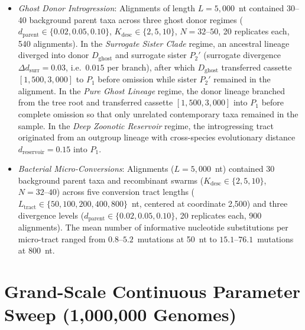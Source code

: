 \begin{itemize}
    \item \emph{Ghost Donor Introgression}: Alignments of length $L = 5{,}000$~nt contained 30--40 background parent taxa across three ghost donor regimes ($d_{\mathrm{parent}} \in \{0.02, 0.05, 0.10\}$, $K_{\mathrm{desc}} \in \{2, 5, 10\}$, $N = 32\text{--}50$, 20 replicates each, 540 alignments).
    In the \emph{Surrogate Sister Clade} regime, an ancestral lineage diverged into donor $D_{\mathrm{ghost}}$ and surrogate sister $P_2'$ (surrogate divergence $\Delta d_{\mathrm{surr}} = 0.03$, i.e.\ $0.015$ per branch), after which $D_{\mathrm{ghost}}$ transferred cassette $[1{,}500, 3{,}000]$ to $P_1$ before omission while sister $P_2'$ remained in the alignment.
    In the \emph{Pure Ghost Lineage} regime, the donor lineage branched from the tree root and transferred cassette $[1{,}500, 3{,}000]$ into $P_1$ before complete omission so that only unrelated contemporary taxa remained in the sample.
    In the \emph{Deep Zoonotic Reservoir} regime, the introgressing tract originated from an outgroup lineage with cross-species evolutionary distance $d_{\mathrm{reservoir}} = 0.15$ into $P_1$.
    
    \item \emph{Bacterial Micro-Conversions}: Alignments ($L = 5{,}000$~nt) contained 30 background parent taxa and recombinant swarms ($K_{\mathrm{desc}} \in \{2, 5, 10\}$, $N = 32\text{--}40$) across five conversion tract lengths ($L_{\mathrm{tract}} \in \{50, 100, 200, 400, 800\}$~nt, centered at coordinate 2,500) and three divergence levels ($d_{\mathrm{parent}} \in \{0.02, 0.05, 0.10\}$, 20 replicates each, 900 alignments). The mean number of informative nucleotide substitutions per micro-tract ranged from $0.8\text{--}5.2$~mutations at 50~nt to $15.1\text{--}76.1$~mutations at 800~nt.
\end{itemize}

\section{Grand-Scale Continuous Parameter Sweep (1,000,000 Genomes)}
\label{supp:grand_sweep_protocol}

